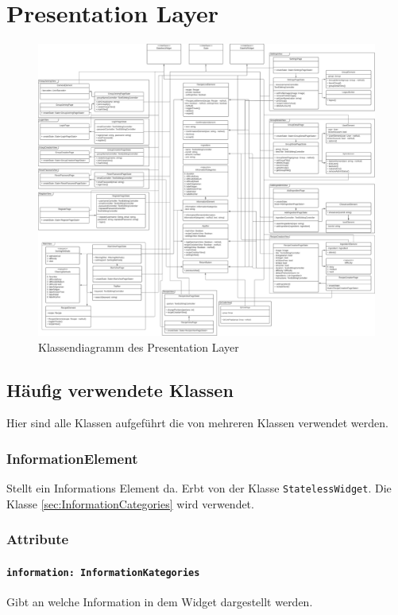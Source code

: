\documentclass{entwurfsheft}
\begin{document}
\section{Presentation Layer}
    \begin{figure}[htp]
        \centering
        \includegraphics[width = \textwidth]{images/Presentation-layer/PresentationLayer.pdf}
        \caption{Klassendiagramm des Presentation Layer}
        \label{fig:presentation-layer}
    \end{figure}

\newpage

\subsection{Häufig verwendete Klassen}
    Hier sind alle Klassen aufgeführt die von mehreren Klassen verwendet werden.

    \subsubsection{InformationElement} \label{sec:InformationElement}
        Stellt ein Informations Element da. Erbt von der Klasse \texttt{StatelessWidget}. Die Klasse \ref{sec:InformationCategories} wird verwendet.
        \subsubsection*{Attribute}
            \paragraph*{\texttt{information: InformationKategories}} Gibt an welche Information in dem Widget dargestellt werden.
\end{document}
